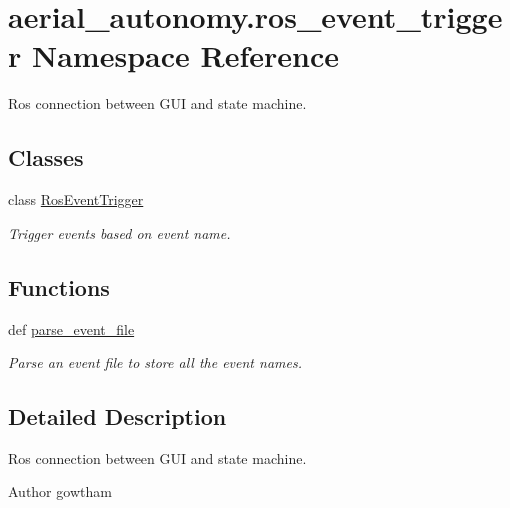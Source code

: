 \hypertarget{namespaceaerial__autonomy_1_1ros__event__trigger}{\section{aerial\-\_\-autonomy.\-ros\-\_\-event\-\_\-trigger Namespace Reference}
\label{namespaceaerial__autonomy_1_1ros__event__trigger}
}


Ros connection between G\-U\-I and state machine.  


\subsection*{Classes}
\begin{DoxyCompactItemize}
\item 
class \hyperlink{classaerial__autonomy_1_1ros__event__trigger_1_1RosEventTrigger}{Ros\-Event\-Trigger}
\begin{DoxyCompactList}\small\item\em Trigger events based on event name. \end{DoxyCompactList}\end{DoxyCompactItemize}
\subsection*{Functions}
\begin{DoxyCompactItemize}
\item 
def \hyperlink{namespaceaerial__autonomy_1_1ros__event__trigger_aba3ce776fb18b017fde0d8c6257a4b0a}{parse\-\_\-event\-\_\-file}
\begin{DoxyCompactList}\small\item\em Parse an event file to store all the event names. \end{DoxyCompactList}\end{DoxyCompactItemize}


\subsection{Detailed Description}
Ros connection between G\-U\-I and state machine. \begin{DoxyAuthor}{Author}
gowtham 
\end{DoxyAuthor}


